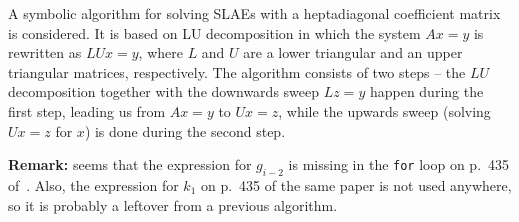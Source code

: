 \documentclass[11pt, a4paper]{article}
\begin{document}
A symbolic algorithm for solving SLAEs with a heptadiagonal coefficient matrix
is considered. It is based on LU decomposition in which the system $Ax = y$ is
rewritten as $LUx = y$, where $L$ and $U$ are a lower triangular and an upper
triangular matrices, respectively. The algorithm consists of two steps -- the
$LU$ decomposition together with the downwards sweep $Lz = y$ happen during the
first step, leading us from $Ax = y$ to $Ux = z$, while the upwards sweep
(solving $Ux = z$ for $x$) is done during the second step.
%

\textbf{Remark:} seems that the expression for $g_{i-2}$ is missing in the
\texttt{for} loop on p.~435 of~\cite{Karawia_2013b}. Also, the expression for
$k_{1}$ on p.~435 of the same paper is not used anywhere, so it is probably
a leftover from a previous algorithm.
\end{document}
